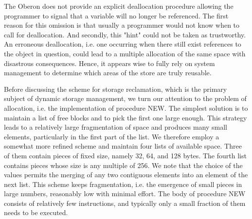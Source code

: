 The Oberon does not provide an explicit deallocation procedure allowing the programmer
to signal that a variable will no longer be referenced. The first reason for this omission is that
usually a programmer would not know when to call for deallocation. And secondly, this "hint" could
not be taken as trustworthy. An erroneous deallocation, i.e. one occurring when there still exist
references to the object in question, could lead to a multiple allocation of the same space with
disastrous consequences. Hence, it appears wise to fully rely on system management to determine
which areas of the store are truly reusable.

Before discussing the scheme for storage reclamation, which is the primary subject of dynamic
storage management, we turn our attention to the problem of allocation, i.e. the implementation of
procedure NEW. The simplest solution is to maintain a list of free blocks and to pick the first one
large enough. This strategy leads to a relatively large fragmentation of space and produces many
small elements, particularly in the first part of the list. We therefore employ a somewhat more
refined scheme and maintain four lists of available space. Three of them contain pieces of fixed
size, namely 32, 64, and 128 bytes. The fourth list contains pieces whose size is any multiple of
256. We note that the choice of the values permits the merging of any two contiguous elements into
an element of the next list. This scheme keeps fragmentation, i.e. the emergence of small pieces in
large numbers, reasonably low with minimal effort. The body of procedure NEW consists of
relatively few instructions, and typically only a small fraction of them needs to be executed.

